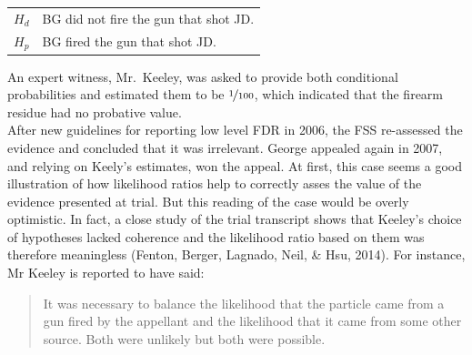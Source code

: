 \documentclass[10pt,dvipsnames,enabledeprecatedfontcommands]{scrartcl}
\begin{document}
\begin{center}
    \begin{tabular}{lp{12cm}} 
$H_d$ & BG did not fire the gun that shot JD.\\
$H_p$ & BG fired the gun that shot JD.
\end{tabular}
\end{center}

\vspace{2mm} \noindent  An expert witness, Mr.~Keeley, was asked to
provide both conditional probabilities and estimated them to be
\(\nicefrac{1}{100}\), which indicated that the firearm residue had no
probative value.\\
After new guidelines for reporting low level FDR in 2006, the FSS
re-assessed the evidence and concluded that it was irrelevant. George
appealed again in 2007, and relying on Keely's estimates, won the
appeal. At first, this case seems a good illustration of how likelihood
ratios help to correctly asses the value of the evidence presented at
trial. But this reading of the case would be overly optimistic. In fact,
a close study of the trial transcript shows that Keeley's choice of
hypotheses lacked coherence and the likelihood ratio based on them was
therefore meaningless (Fenton, Berger, Lagnado, Neil, \& Hsu, 2014). For
instance, Mr Keeley is reported to have said:

\begin{quote}
    It was necessary to balance the likelihood that the particle came from a gun fired by the appellant and the likelihood that it came from some other source. Both were unlikely but both were possible.
\end{quote}
\end{document}
